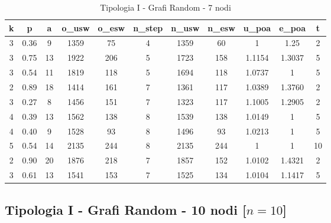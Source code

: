 \begin{table}[H]
\centering
\scalebox{0.9} {
\begin{tabular}{|c|c|c|c|c|c|c|c|c|c|c|}
\hline
\textbf{k} & \textbf{p} & \textbf{a} & \textbf{o\_usw} & \textbf{o\_esw} & \textbf{n\_step} & \textbf{n\_usw} & \textbf{n\_esw} & \textbf{u\_poa} & \textbf{e\_poa} & \textbf{t} \\ \hline
3 & 0.36 & 9 & 1359 & 75 & 4 & 1359 & 60 & 1 & 1.25 & 2 \\ \hline
3 & 0.75 & 13 & 1922 & 206 & 5 & 1723 & 158 & 1.1154 & 1.3037 & 5 \\ \hline
3 & 0.54 & 11 & 1819 & 118 & 5 & 1694 & 118 & 1.0737 & 1 & 5 \\ \hline
2 & 0.89 & 18 & 1414 & 161 & 7 & 1361 & 117 & 1.0389 & 1.3760 & 2 \\ \hline
3 & 0.27 & 8 & 1456 & 151 & 7 & 1323 & 117 & 1.1005 & 1.2905 & 2 \\ \hline
4 & 0.39 & 13 & 1562 & 138 & 8 & 1539 & 138 & 1.0149 & 1 & 5 \\ \hline
4 & 0.40 & 9 & 1528 & 93 & 8 & 1496 & 93 & 1.0213 & 1 & 5 \\ \hline
5 & 0.54 & 14 & 2135 & 244 & 8 & 2135 & 244 & 1 & 1 & 10 \\ \hline
2 & 0.90 & 20 & 1876 & 218 & 7 & 1857 & 152 & 1.0102 & 1.4321 & 2 \\ \hline
3 & 0.61 & 13 & 1541 & 153 & 7 & 1525 & 134 & 1.0104 & 1.1417 & 5 \\ \hline
\end{tabular}
}
\caption{Tipologia I - Grafi Random - 7 nodi}
\label{tab:sperimentazione-tipo1-7nodi}
\end{table}

\subsection{Tipologia I - Grafi Random - 10 nodi [$n=10$]}

